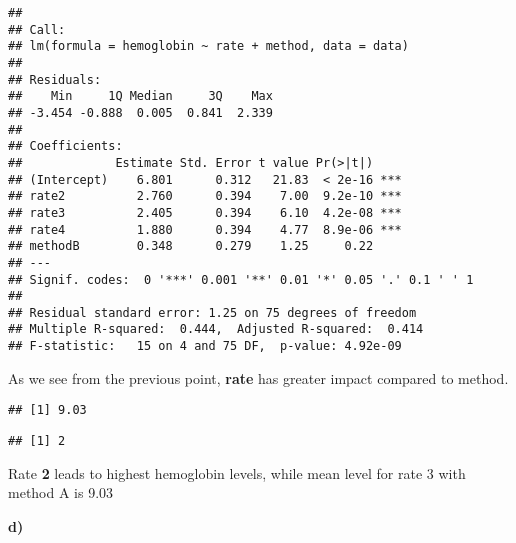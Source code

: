 \documentclass[
]{article}
\newenvironment{Shaded}{\begin{snugshade}}{\end{snugshade}}
\newcommand{\AttributeTok}[1]{\textcolor[rgb]{0.13,0.29,0.53}{#1}}
\newcommand{\DecValTok}[1]{\textcolor[rgb]{0.00,0.00,0.81}{#1}}
\newcommand{\FunctionTok}[1]{\textcolor[rgb]{0.13,0.29,0.53}{\textbf{#1}}}
\newcommand{\NormalTok}[1]{#1}
\newcommand{\SpecialCharTok}[1]{\textcolor[rgb]{0.81,0.36,0.00}{\textbf{#1}}}
\newcommand{\StringTok}[1]{\textcolor[rgb]{0.31,0.60,0.02}{#1}}
\begin{document}
\begin{verbatim}
## 
## Call:
## lm(formula = hemoglobin ~ rate + method, data = data)
## 
## Residuals:
##    Min     1Q Median     3Q    Max 
## -3.454 -0.888  0.005  0.841  2.339 
## 
## Coefficients:
##             Estimate Std. Error t value Pr(>|t|)    
## (Intercept)    6.801      0.312   21.83  < 2e-16 ***
## rate2          2.760      0.394    7.00  9.2e-10 ***
## rate3          2.405      0.394    6.10  4.2e-08 ***
## rate4          1.880      0.394    4.77  8.9e-06 ***
## methodB        0.348      0.279    1.25     0.22    
## ---
## Signif. codes:  0 '***' 0.001 '**' 0.01 '*' 0.05 '.' 0.1 ' ' 1
## 
## Residual standard error: 1.25 on 75 degrees of freedom
## Multiple R-squared:  0.444,  Adjusted R-squared:  0.414 
## F-statistic:   15 on 4 and 75 DF,  p-value: 4.92e-09
\end{verbatim}

As we see from the previous point, \textbf{rate} has greater impact
compared to method.

\begin{Shaded}
\end{Shaded}

\begin{verbatim}
## [1] 9.03
\end{verbatim}

\begin{Shaded}
\end{Shaded}

\begin{verbatim}
## [1] 2
\end{verbatim}

Rate \textbf{2} leads to highest hemoglobin levels, while mean level for
rate 3 with method A is 9.03

\textbf{d)}
\end{document}
